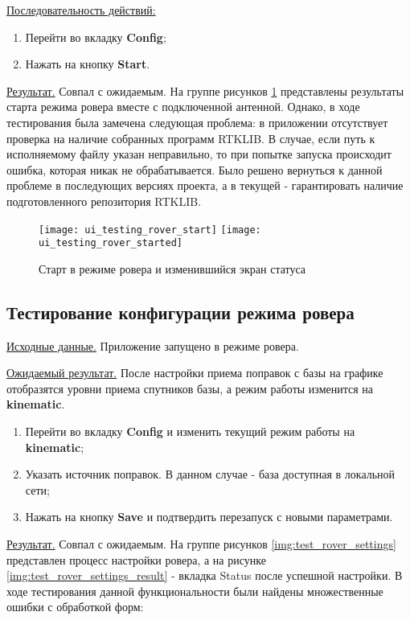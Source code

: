 \underline{Последовательность действий:}

\begin{enumerate}
  \item Перейти во вкладку \textbf{Config};
  \item Нажать на кнопку \textbf{Start}.
\end{enumerate}

\underline{Результат.} Совпал с ожидаемым. На группе рисунков \ref{img:rover_start} представлены результаты старта режима ровера вместе с подключенной антенной. Однако, в ходе тестирования была замечена следующая проблема: в приложении отсутствует проверка на наличие собранных программ RTKLIB. В случае, если путь к исполняемому файлу указан неправильно, то при попытке запуска происходит ошибка, которая никак не обрабатывается. Было решено вернуться к данной проблеме в последующих версиях проекта, а в текущей - гарантировать наличие подготовленного репозитория RTKLIB.

\begin{figure}
  \center
  \texttt{[image: ui\_testing\_rover\_start]}
  \texttt{[image: ui\_testing\_rover\_started]}
  \caption{Старт в режиме ровера и изменившийся экран статуса}
  \label{img:rover_start}
\end{figure}

\subsection{Тестирование конфигурации режима ровера} \label{subsect4_2_3}

\underline{Исходные данные.} Приложение запущено в режиме ровера.

\underline{Ожидаемый результат.} После настройки приема поправок с базы на графике отобразятся уровни приема спутников базы, а режим работы изменится на \textbf{kinematic}.

\begin{enumerate}
  \item Перейти во вкладку \textbf{Config} и изменить текущий режим работы на \textbf{kinematic};
  \item Указать источник поправок. В данном случае - база доступная в локальной сети;
  \item Нажать на кнопку \textbf{Save} и подтвердить перезапуск с новыми параметрами.
\end{enumerate}

\underline{Результат.} Совпал с ожидаемым. На группе рисунков \ref{img:test_rover_settings} представлен процесс настройки ровера, а на рисунке \ref{img:test_rover_settings_result} - вкладка Status после успешной настройки. В ходе тестирования данной функциональности были найдены множественные ошибки с обработкой форм:

